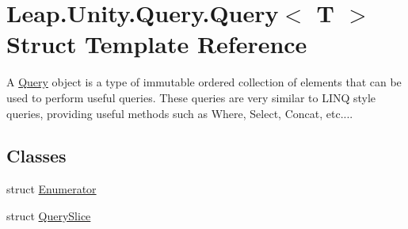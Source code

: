 \hypertarget{struct_leap_1_1_unity_1_1_query_1_1_query}{}\section{Leap.\+Unity.\+Query.\+Query$<$ T $>$ Struct Template Reference}
\label{struct_leap_1_1_unity_1_1_query_1_1_query}


A \mbox{\hyperlink{struct_leap_1_1_unity_1_1_query_1_1_query}{Query}} object is a type of immutable ordered collection of elements that can be used to perform useful queries. These queries are very similar to L\+I\+NQ style queries, providing useful methods such as Where, Select, Concat, etc....  


\subsection*{Classes}
\begin{DoxyCompactItemize}
\item 
struct \mbox{\hyperlink{struct_leap_1_1_unity_1_1_query_1_1_query_1_1_enumerator}{Enumerator}}
\item 
struct \mbox{\hyperlink{struct_leap_1_1_unity_1_1_query_1_1_query_1_1_query_slice}{Query\+Slice}}
\end{DoxyCompactItemize}
